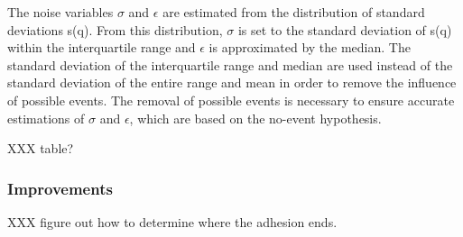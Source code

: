 \documentclass[%
  aip,12pt,tightenlines,
  amsthm,
 amsmath,amssymb
]{article}
\begin{document}
The noise variables $\sigma$ and $\epsilon$ are estimated from the distribution of standard deviations s(q). From this distribution, $\sigma$ is set to the standard deviation of s(q) within the interquartile range and $\epsilon$ is approximated by the median. The standard deviation of the interquartile range and median are used instead of the standard deviation of the entire range and mean in order to remove the influence of possible events. The removal of possible events is necessary to ensure accurate estimations of $\sigma$ and $\epsilon$, which are based on the no-event hypothesis.

XXX table?

\subsubsection{Improvements}

XXX figure out how to determine where the adhesion ends.
\end{document}
